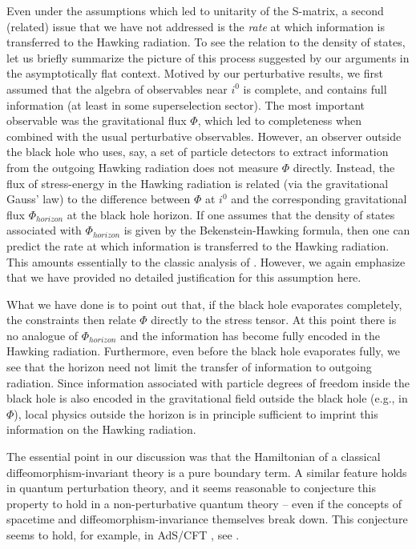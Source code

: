 \documentclass[12pt,onecolumn,eqsecnum,aps,prd,nofootinbib]{revtex4}
\begin{document}
Even under the assumptions which led to unitarity of the S-matrix, a second (related) issue that we have not addressed is the {\em rate} at which information is transferred to the Hawking radiation.   To see the relation to the density of states, let us briefly summarize the picture of this process suggested by our arguments in the asymptotically flat context.  Motived by our perturbative results, we first assumed that the algebra of observables near $i^0$ is complete, and contains full information (at least in some superselection sector).  The most important observable was the gravitational flux $\Phi$, which led to completeness when combined with the usual perturbative observables.  However, an observer outside the black hole who uses, say, a set of particle detectors to extract information from the outgoing Hawking radiation does not measure $\Phi$ directly.  Instead, the flux of stress-energy in the Hawking radiation is related (via the gravitational Gauss' law) to the difference between $\Phi$ at $i^0$ and the corresponding gravitational flux $\Phi_{horizon}$ at the black hole horizon.   If one assumes that the density of states associated with $\Phi_{horizon}$ is given by the Bekenstein-Hawking formula, then one can predict the rate at which information is transferred to the Hawking radiation.  This amounts essentially to the classic analysis of \cite{Page}.  However, we again emphasize that we have provided no detailed justification for this assumption here.

What we have done is to point out that, if the black hole evaporates completely, the constraints then relate $\Phi$ directly to the stress tensor.  At this point there is no analogue of $\Phi_{horizon}$ and the information has become fully encoded in the Hawking radiation.   Furthermore, even before the black hole evaporates fully, we see that the horizon need not limit the transfer of information to outgoing radiation.  Since information associated with particle degrees of freedom inside the black hole is also encoded in the gravitational field outside the black hole (e.g., in $\Phi$), local physics outside the horizon is in principle sufficient to imprint this information on the Hawking radiation.

The essential point in our discussion was that the Hamiltonian of a
classical diffeomorphism-invariant theory is a pure boundary term.  A similar
feature holds in quantum perturbation theory, and it seems reasonable to
conjecture this property to hold in a non-perturbative quantum
theory -- even if the concepts of spacetime and
diffeomorphism-invariance themselves break down. This conjecture seems to hold, for example, in AdS/CFT  \cite{LargeN}, see \cite{HS,BK}.
\end{document}
